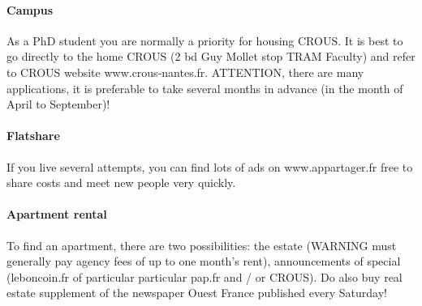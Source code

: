 \paragraph{Campus}
As a PhD student you are normally a priority for housing CROUS.
It is best to go directly to the home CROUS (2 bd Guy Mollet stop TRAM Faculty) and refer to CROUS website www.crous-nantes.fr.
ATTENTION, there are many applications, it is preferable to take several months in advance (in the month of April to September)!


\paragraph{Flatshare}
If you live several attempts, you can find lots of ads on www.appartager.fr free to share costs and meet new people very quickly.


\paragraph{Apartment rental}
To find an apartment, there are two possibilities: the estate (WARNING must generally pay agency fees of up to one month's rent), announcements of special (leboncoin.fr of particular particular pap.fr and / or CROUS).
Do also buy real estate supplement of the newspaper Ouest France published every Saturday!


